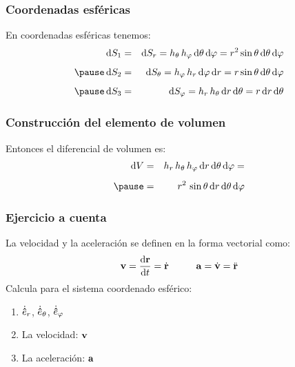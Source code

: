 \documentclass[12pt]{beamer}
\begin{document}
\begin{frame}
\frametitle{Coordenadas esféricas}
En coordenadas esféricas tenemos:
\pause
\begin{eqnarray*}
\dd{S_{1}} &=& \dd{S_{r}} = h_{\theta} \, h_{\varphi} \dd{\theta} \dd{\varphi} = r^{2} \sin \theta \dd{\theta} \dd{\varphi} \\[0.5em] \pause
\dd{S_{2}} &=& \dd{S_{\theta}} = h_{\varphi} \, h_{r} \dd{\varphi} \dd{r} = r \sin \theta \dd{\theta} \dd{\varphi} \\[0.5em] \pause
\dd{S_{3}} &=& \dd{S_{\varphi}} = h_{r} \, h_{\theta} \dd{r} \dd{\theta} = r \dd{r} \dd{\theta}
\end{eqnarray*}
\end{frame}
\begin{frame}
\frametitle{Construcción del elemento de volumen}
Entonces el diferencial de volumen es:
\pause
\begin{eqnarray*}
\dd{V} &=& h_{r} \, h_{\theta} \, h_{\varphi} \dd{r} \dd{\theta} \dd{\varphi} = \\[0.5em] \pause
&=& r^{2} \, \sin \theta \dd{r} \dd{\theta} \dd{\varphi}
\end{eqnarray*}
\end{frame}
\begin{frame}
\frametitle{Ejercicio a cuenta}
La velocidad y la aceleración se definen en la forma vectorial como:
\begin{align*}
\vb{v} = \dv{\vb{r}}{t} = \dot{\vb{r}} \hspace{1cm} \vb{a} = \dot{\vb{v}} = \ddot{\vb{r}}
\end{align*}
Calcula para el sistema coordenado esférico:
\begin{enumerate}[<+->]
\item $\dot{\vu{e}}_{r}$, $\dot{\vu{e}}_{\theta}$, $\dot{\vu{e}}_{\varphi}$ 
\item La velocidad: $\vb{v}$
\item La aceleración: $\vb{a}$
\end{enumerate}
\end{frame}
\end{document}
